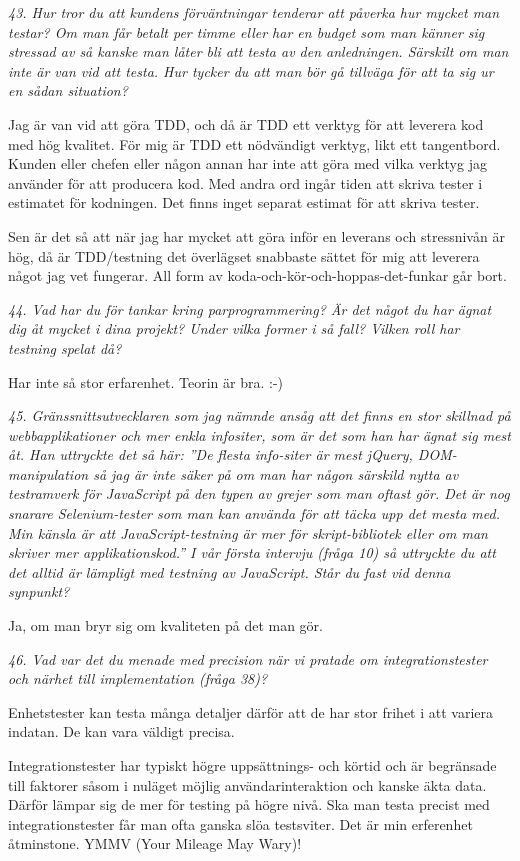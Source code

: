 \documentclass[11pt]{article}
\begin{document}
\emph{43. Hur tror du att kundens förväntningar tenderar att påverka hur mycket man testar? Om man får betalt per timme eller har en budget som man känner sig stressad av så kanske man låter bli att testa av den anledningen. Särskilt om man inte är van vid att testa. Hur tycker du att man bör gå tillväga för att ta sig ur en sådan situation?}

Jag är van vid att göra TDD, och då är TDD ett verktyg för att leverera kod med hög kvalitet. För mig är TDD ett nödvändigt verktyg, likt ett tangentbord. Kunden eller chefen eller någon annan har inte att göra med vilka verktyg jag använder för att producera kod. Med andra ord ingår tiden att skriva tester i estimatet för kodningen. Det finns inget separat estimat för att skriva tester.

Sen är det så att när jag har mycket att göra inför en leverans och stressnivån är hög, då är TDD/testning det överlägset snabbaste sättet för mig att leverera något jag vet fungerar. All form av koda-och-kör-och-hoppas-det-funkar går bort.

\emph{44. Vad har du för tankar kring parprogrammering? Är det något du har ägnat dig åt mycket i dina projekt? Under vilka former i så fall? Vilken roll har testning spelat då?}

Har inte så stor erfarenhet. Teorin är bra. :-)

\emph{45. Gränssnittsutvecklaren som jag nämnde ansåg att det finns en stor skillnad på webbapplikationer och mer enkla infositer, som är det som han har ägnat sig mest åt. Han uttryckte det så här: ”De flesta info-siter är mest jQuery, DOM-manipulation så jag är inte säker på om man har någon särskild nytta av testramverk för JavaScript på den typen av grejer som man oftast gör. Det är nog snarare Selenium-tester som man kan använda för att täcka upp det mesta med. Min känsla är att JavaScript-testning är mer för skript-bibliotek eller om man skriver mer applikationskod.” I vår första intervju (fråga 10) så uttryckte du att det alltid är lämpligt med testning av JavaScript. Står du fast vid denna synpunkt?}

Ja, om man bryr sig om kvaliteten på det man gör.

\emph{46. Vad var det du menade med precision när vi pratade om integrationstester och närhet till implementation (fråga 38)?}

Enhetstester kan testa många detaljer därför att de har stor frihet i att variera indatan. De kan vara väldigt precisa.

Integrationstester har typiskt högre uppsättnings- och körtid och är begränsade till faktorer såsom i nuläget möjlig användarinteraktion och kanske äkta data. Därför lämpar sig de mer för testing på högre nivå. Ska man testa precist med integrationstester får man ofta ganska slöa testsviter. Det är min erferenhet åtminstone. YMMV (Your Mileage May Wary)!
\end{document}
